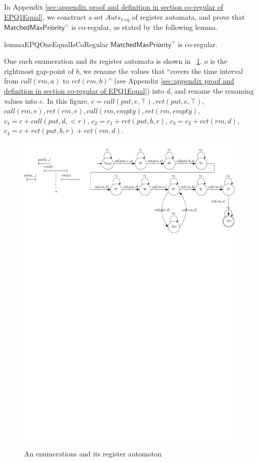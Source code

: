In Appendix \ref{sec:appendix proof and definition in section co-regular of EPQ1Equal}, we construct a set $\textit{Auts}_{\textit{1-eq}}$ of register automata, and prove that $\mathsf{MatchedMaxPriority}^{=}$ is co-regular, as stated by the following lemma.

\begin{restatable}{lemma}{EPQOneEqualIsCoRegular}
\label{lemma:EPQ1Equal is co-regular}
$\mathsf{MatchedMaxPriority}^{=}$ is co-regular.
\end{restatable}

One such enumeration and its register automata is shown in \figurename~\ref{fig:an enumeration and its witness automaton}. $o$ is the rightmost gap-point of $b$, we rename the values that ``covers the time interval from $\textit{call}(\textit{rm},a)$ to $\textit{ret}(\textit{rm},b)$'' (see Appendix \ref{sec:appendix proof and definition in section co-regular of EPQ1Equal}) into $d$, and rename the renaming values into $e$. In this figure, $c = \textit{call}(\textit{put},e,\top),\textit{ret}(\textit{put},e,\top)$, $\textit{call}(\textit{rm},e), \textit{ret}(\textit{rm},e),\textit{call}(\textit{rm},\textit{empty}),\textit{ret}(\textit{rm},\textit{empty})$, $c_1 = c + \textit{call}(\textit{put},d,<r)$, $c_2 = c_1 + \textit{ret}(\textit{put},b,r)$, $c_3 = c_2 + \textit{ret}(\textit{rm},d)$, $c_4 = c + \textit{ret}(\textit{put},b,r) + \textit{ret}(\textit{rm},d)$.

\begin{figure}[htbp]
  \centering
  \includegraphics[width=0.8 \textwidth]{figures/PIC-Enumeration-WitnessAutomata.pdf}
  \caption{An enumerations and its register automaton}
  \label{fig:an enumeration and its witness automaton}
\end{figure}


